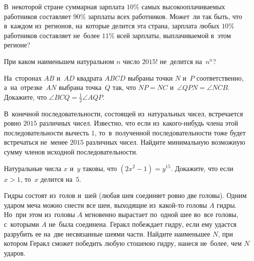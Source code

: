 \begin{problems}

\item
В~некоторой стране суммарная зарплата $10\%$ самых высокооплачиваемых
работников составляет $90\%$ зарплаты всех работников.
Может~ли так быть, что в~каждом из~регионов, на~которые делится эта страна,
зарплата любых $10\%$ работников составляет не~более $11\%$
всей зарплаты, выплачиваемой в~этом регионе?

\item
При каком наименьшем натуральном $n$ число $2015!$ не~делится на~$n^n$?

\item
На~сторонах $AB$ и~$AD$ квадрата $ABCD$ выбраны точки $N$ и~$P$ соответственно,
а~на~отрезке~$AN$ выбрана точка~$Q$ так, что $NP = NC$
и~$\angle QPN = \angle NCB$.
Докажите, что $\angle BCQ = \frac{1}{2} \angle AQP$.

\item
В~конечной последовательности, состоящей из~натуральных чисел, встречается
ровно $2015$ различных чисел.
Известно, что если из~какого-нибудь члена этой последовательности вычесть $1$,
то~в~полученной последовательности тоже будет встречаться не~менее $2015$
различных чисел.
Найдите минимальную возможную сумму членов исходной последовательности.

\item
Натуральные числа $x$ и~$y$ таковы, что $(2 x^2 - 1) = y^{15}$.
Докажите, что если $x > 1$, то~$x$ делится на~$5$.

\end{problems}

\else


\additionalsection

\fi

\ifsecondpart

\begin{problems}

\item
Гидры состоят из~голов и~шей (любая шея соединяет ровно две головы).
Одним ударом меча можно снести все шеи, выходящие из~какой-то головы $A$ гидры.
Но~при этом из~головы $A$ мгновенно вырастает по~одной шее во~все головы,
с~которыми $A$ не~была соединена.
Геракл побеждает гидру, если ему удастся разрубить ее на~две несвязанные шеями
части.
Найдите наименьшее $N$, при котором Геракл сможет победить любую стошеюю гидру,
нанеся не~более, чем $N$ ударов.

\end{problems}

\fi


